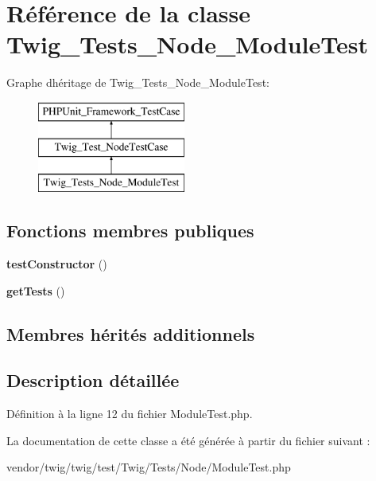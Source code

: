 \hypertarget{class_twig___tests___node___module_test}{}\section{Référence de la classe Twig\+\_\+\+Tests\+\_\+\+Node\+\_\+\+Module\+Test}
\label{class_twig___tests___node___module_test}
Graphe d\textquotesingle{}héritage de Twig\+\_\+\+Tests\+\_\+\+Node\+\_\+\+Module\+Test\+:\begin{figure}[H]
\begin{center}
\leavevmode
\includegraphics[height=3.000000cm]{class_twig___tests___node___module_test}
\end{center}
\end{figure}
\subsection*{Fonctions membres publiques}
\begin{DoxyCompactItemize}
\item 
{\bfseries test\+Constructor} ()\hypertarget{class_twig___tests___node___module_test_a47094dc941e72950570900d1418f89c6}{}\label{class_twig___tests___node___module_test_a47094dc941e72950570900d1418f89c6}

\item 
{\bfseries get\+Tests} ()\hypertarget{class_twig___tests___node___module_test_a7e247dd31cc8d37a6c97353a062a0080}{}\label{class_twig___tests___node___module_test_a7e247dd31cc8d37a6c97353a062a0080}

\end{DoxyCompactItemize}
\subsection*{Membres hérités additionnels}


\subsection{Description détaillée}


Définition à la ligne 12 du fichier Module\+Test.\+php.



La documentation de cette classe a été générée à partir du fichier suivant \+:\begin{DoxyCompactItemize}
\item 
vendor/twig/twig/test/\+Twig/\+Tests/\+Node/Module\+Test.\+php\end{DoxyCompactItemize}
